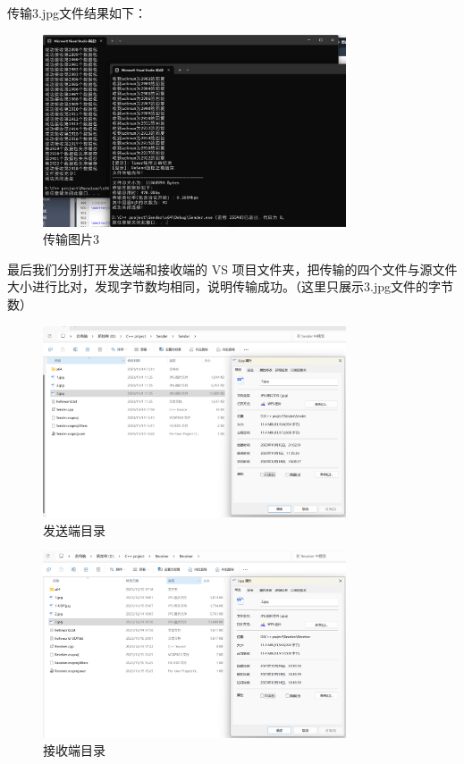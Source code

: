 \documentclass[UTF8,a4paper,10pt]{ctexart}
\begin{document}
传输3.jpg文件结果如下：
\begin{figure}[H]
    \centering
\includegraphics[width=0.8\textwidth]{img/传输图片3.png}
    \caption{传输图片3}
\end{figure}
最后我们分别打开发送端和接收端的 VS 项目文件夹，把传输的四个文件与源文件大小进行比对，发现字节数均相同，说明传输成功。（这里只展示3.jpg文件的字节数）
\begin{figure}[H]
    \centering
\includegraphics[width=0.8\textwidth]{img/发送端目录.png}
    \caption{发送端目录}
\end{figure}
\begin{figure}[H]
    \centering
\includegraphics[width=0.8\textwidth]{img/接收端目录.png}
    \caption{接收端目录}
\end{figure}
\end{document}
